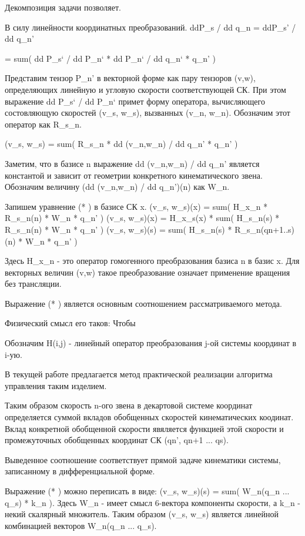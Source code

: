 \documentclass[12pt,a4paper,titlepage]{article}
\begin{document}
Декомпозиция задачи позволяет.

\newpage
В силу линейности координатных преобразований. 
ddP\_s / dd q\_n = ddP\_s' / dd q\_n'

 = sum( dd P\_s` / dd P\_n` * dd P\_n` / dd q\_n` * q\_n' )

 Представим тензор P\_n' в векторной форме как пару тензоров (v,w), определяющих линейную и угловую скорости соответствующей СК. При этом выражение 
 dd P\_s` / dd P\_n` примет форму оператора, вычисляющего состовляющую скоростей (v\_s, w\_s), вызванных (v\_n, w\_n). Обозначим этот оператор как R\_s\_n.

(v\_s, w\_s) = sum(  R\_s\_n * dd (v\_n,w\_n) / dd q\_n' * q\_n' )

Заметим, что в базисе n выражение dd (v\_n,w\_n) / dd q\_n' является константой и зависит от геометрии конкретного кинематического звена. Обозначим величину (dd (v\_n,w\_n) / dd q\_n')(n) как W\_n.

Запишем уравнение (* ) в базисе СК x.
(v\_s, w\_s)(x) = sum( H\_x\_n * R\_s\_n(n) * W\_n * q\_n' )
(v\_s, w\_s)(x) = H\_x\_s(x) * sum( H\_s\_n(s) * R\_s\_n(n) * W\_n * q\_n' )
(v\_s, w\_s)(s) = sum( H\_s\_n(s) * R\_s\_n(qn+1..s)(n) * W\_n * q\_n' )


Здесь H\_x\_n - это оператор гомогенного преобразования базиса n в базис x. Для векторных величин (v,w) такое преобразование означает применение вращения без трансляции.

Выражение (* ) является основным соотношением рассматриваемого метода.

Физический смысл его таков: Чтобы 

Обозначим H(i,j) - линейный оператор преобразования j-ой системы координат в i-ую. 

В текущей работе предлагается метод практической реализации алгоритма управления таким изделием.

Таким образом скорость n-ого звена в декартовой системе координат определяется суммой вкладов обобщенных скоростей кинематических коодинат. Вклад конкретной обобщенной скорости явяляется функцией этой скорости и промежуточных обобщенных координат СК (qn', qn+1 ... qs).

Выведенное соотношение соответствует прямой задаче кинематики системы, записанному в дифференциальной форме.

Выражение (* ) можно переписать в виде:
(v\_s, w\_s)(s) = sum( W\_n(q\_n ... q\_s) * k\_n ). Здесь W\_n - имеет смысл 6-вектора компоненты скорости, а k\_n - некий скалярный множитель. Таким образом (v\_s, w\_s) является линейной комбинацией векторов W\_n(q\_n ... q\_s).
\end{document}
